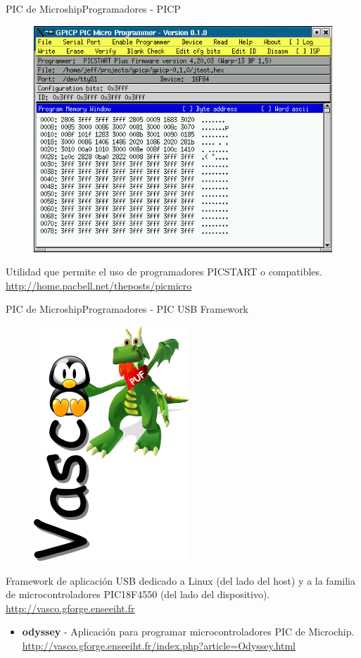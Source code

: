 \documentclass{beamer}
\begin{document}
\begin{frame}{PIC de Microship}{Programadores - PICP}
  \begin{figure}[!h]
    \centering
    \includegraphics[scale=0.3]{img/gpicp.png}
  \end{figure}
  Utilidad que permite el uso de programadores PICSTART o compatibles. \url{http://home.pacbell.net/theposts/picmicro}  
\end{frame}

\begin{frame}{PIC de Microship}{Programadores - PIC USB Framework}
  \begin{figure}[!h]
    \centering
    \includegraphics[scale=0.25]{img/vasco.png}
  \end{figure}
  Framework de aplicación USB dedicado a Linux (del lado del host) y a la familia de microcontroladores PIC18F4550 (del lado del dispositivo). \url{http://vasco.gforge.enseeiht.fr}
  \begin{itemize}
  \item \textbf{odyssey} - Aplicación para programar microcontroladores PIC de Microchip. \url{http://vasco.gforge.enseeiht.fr/index.php?article=Odyssey.html} 
  \end{itemize}
\end{frame}
\end{document}
